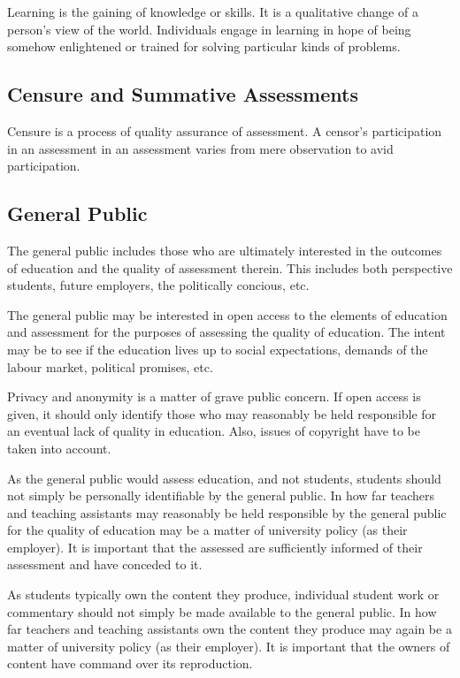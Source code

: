 Learning is the gaining of knowledge or skills. It is a qualitative change of a
person's view of the world. Individuals engage in learning in hope of being
somehow enlightened or trained for solving particular kinds of problems.

\subsection{Censure and Summative Assessments}

Censure is a process of quality assurance of assessment. A censor's
participation in an assessment in an assessment varies from mere observation to
avid participation.

\subsection{General Public}

The general public includes those who are ultimately interested in the outcomes
of education and the quality of assessment therein. This includes both
perspective students, future employers, the politically concious, etc.

The general public may be interested in open access to the elements of
education and assessment for the purposes of assessing the quality of
education. The intent may be to see if the education lives up to social
expectations, demands of the labour market, political promises, etc.

Privacy and anonymity is a matter of grave public concern. If open access is
given, it should only identify those who may reasonably be held responsible for
an eventual lack of quality in education. Also, issues of copyright have to be
taken into account.

As the general public would assess education, and not students, students should
not simply be personally identifiable by the general public. In how far
teachers and teaching assistants may reasonably be held responsible by the
general public for the quality of education may be a matter of university
policy (as their employer). It is important that the assessed are sufficiently
informed of their assessment and have conceded to it.

As students typically own the content they produce, individual student work or
commentary should not simply be made available to the general public. In how
far teachers and teaching assistants own the content they produce may again be
a matter of university policy (as their employer). It is important that the
owners of content have command over its reproduction.
